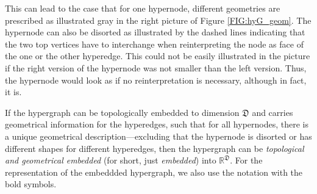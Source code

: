 \documentclass[a4paper, english, 12pt, reqno, draft]{amsart}
\theoremstyle{definition}
\theoremstyle{remark}
\numberwithin{equation}{section}
\newcommand{\globDim}{\ensuremath{\mathfrak D}}
\newcommand{\IR}{\ensuremath{\mathbb R}}
\begin{document}
This can lead to the case that for one hypernode, different geometries are prescribed as illustrated gray in the right picture of Figure \ref{FIG:hyG_geom}. The hypernode can also be disorted as illustrated by the dashed lines indicating that the two top vertices have to interchange when reinterpreting the node as face of the one or the other hyperedge. This could not be easily illustrated in the picture if the right version of the hypernode was not smaller than the left version. Thus, the hypernode would look as if no reinterpretation is necessary, although in fact, it is.

If the hypergraph can be topologically embedded to dimension $\globDim$ and carries geometrical information for the hyperedges, such that for all hypernodes, there is a unique geometrical description---excluding that the hypernode is disorted or has different shapes for different hyperedges, then the hypergraph can be \emph{topological and geometrical embedded} (for short, just \emph{embedded}) into $\IR^\globDim$. For the representation of the embeddded hypergraph, we also use the notation with the bold symbols.
% 
\end{document}
